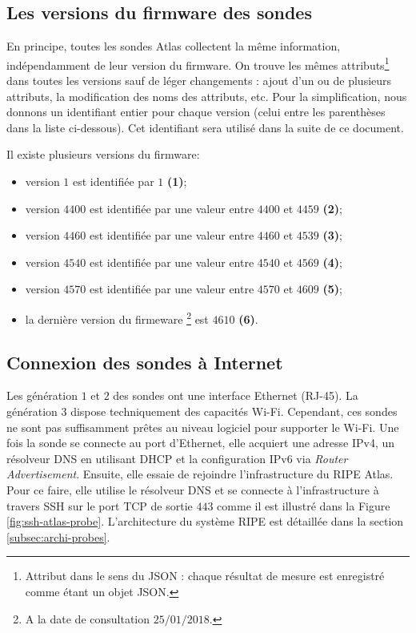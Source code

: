 \subsection{Les versions du firmware des sondes} \label{subsec:firmwareversion}
En principe, toutes les sondes Atlas collectent la même information, indépendamment de leur version du firmware. On trouve les mêmes attributs\footnote{Attribut dans le sens du JSON : chaque résultat de mesure est enregistré comme étant un objet JSON.}  dans toutes les versions sauf de léger changements : ajout d'un ou de plusieurs attributs, la modification des noms des attributs, etc. Pour la simplification, nous donnons un identifiant entier pour chaque version (celui entre les parenthèses dans la liste ci-dessous). Cet identifiant sera utilisé dans la suite de ce document. 



Il existe plusieurs versions du firmware:
\begin{itemize}
	\item version $1$ est identifiée par  $1$\textbf{ (1)};
	\item version $4400$  est identifiée par une valeur entre  $4400$ et $4459$ \textbf{(2)};
	\item version $4460$ est identifiée par une valeur entre $4460$ et $4539$ \textbf{(3)};
	\item version $4540$  est identifiée par une valeur entre  $4540$ et $4569$ \textbf{(4)};
	\item  version $4570$  est identifiée par une valeur entre $4570$ et $4609$ \textbf{(5)};
	\item la dernière version du firmeware \footnote{A la date de consultation $ 25/01/2018 $.} est $4610$ \textbf{(6)}. 
\end{itemize}

\subsection{Connexion des sondes à Internet}

Les génération $1$ et $2$ des sondes  ont une interface Ethernet (RJ-45). La génération $3$ dispose techniquement des capacités Wi-Fi. Cependant, ces sondes ne sont pas suffisamment prêtes au niveau logiciel pour supporter le Wi-Fi.
Une fois la sonde se connecte au port d'Ethernet, elle acquiert  une adresse IPv4, un résolveur DNS  en utilisant DHCP et la configuration IPv6 via \textit{Router Advertisement}. Ensuite, elle essaie de rejoindre l'infrastructure du RIPE Atlas. Pour ce faire, elle utilise le résolveur DNS et se connecte à l'infrastructure à travers SSH sur le port TCP de sortie $443$ comme il est illustré dans la Figure \ref{fig:ssh-atlas-probe}. L'architecture du système RIPE est détaillée dans la section \ref{subsec:archi-probes}.

